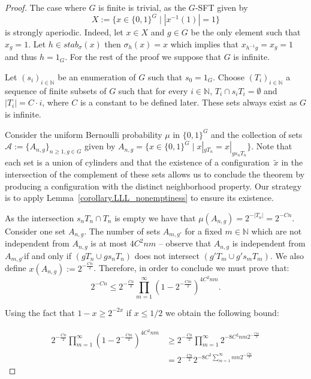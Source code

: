 \documentclass[letterpaper]{article}
\theoremstyle{plain}
\def\NN{\mathbb{N}}
\begin{document}
	\begin{proof}
	
		The case where $G$ is finite is trivial, as the $G$-SFT given by $$X := \{x \in \{0,1\}^G \mid |x^{-1}(1)| = 1 \}$$ is strongly aperiodic. Indeed, let $x \in X$ and $g \in G$ be the only element such that $x_g = 1$. Let $h \in stab_{\sigma}(x)$ then $\sigma_{h}(x) = x$ which implies that $x_{h^{-1}g}= x_g = 1$ and thus $h = 1_G$. For the rest of the proof we suppose that $G$ is infinite.
		
		Let $(s_i)_{i\in\NN}$ be an enumeration of $G$ such that $s_0=1_G$. Choose $(T_i)_{i\in\NN}$ a sequence of finite subsets of $G$ such that for every $i\in\NN$, $T_i\cap s_i T_i =\emptyset$ and $|T_i|=C\cdot i$, where $C$ is a constant to be defined later. These sets always exist as $G$ is infinite.
		
		Consider the uniform Bernoulli probability $\mu$ in $\{0,1\}^G$ and the collection of sets $\mathscr{A} := \{A_{n,g}\}_{n \geq 1, g \in G}$ given by $ A_{n,g} = \{ x \in \{0,1\}^G \mid x|_{gT_n} = x|_{gs_nT_n}\}$. Note that each set is a union of cylinders and that the existence of a configuration~$\tilde{x}$ in the intersection of the complement of these sets allows us to conclude the theorem by producing a configuration with the distinct neighborhood property. Our strategy is to apply Lemma~\ref{corollary.LLL_nonemptiness} to ensure its existence.
		
		As the intersection $s_nT_n \cap T_n$ is empty we have that $\mu(A_{n,g}) = 2^{-|T_n|} = 2^{-C n}$. Consider one set $A_{n,g}$. The number of sets $A_{m,g'}$ for a fixed $m \in \NN$ which are not independent from $A_{n,g}$ is at most $4C^2nm$ -- observe that $A_{n,g}$ is independent from $A_{m,g'}$if and only if $(gT_n\cup gs_nT_n)$ does not intersect $(g'T_m\cup g's_mT_m)$. We also define $x(A_{n,g}) := 2^{-\frac{Cn}{2}}$. Therefore, in order to conclude we must prove that: $$2^{-Cn} \leq 2^{-\frac{Cn}{2}} \prod_{m = 1}^{\infty}(1-2^{-\frac{Cm}{2}})^{4C^2nm}.$$
		
		Using the fact that $1-x \geq 2^{-2x}$ if $x \leq 1/2$ we obtain the following bound:
		
		\begin{align*}
		2^{-\frac{Cn}{2}} \prod_{m = 1}^{\infty}(1-2^{-\frac{Cm}{2}})^{4C^2nm}& \geq 2^{-\frac{Cn}{2}} \prod_{m = 1}^{\infty}2^{-8C^2nm2^{-\frac{Cm}{2}} } \\
		& = 2^{-\frac{Cn}{2}}2^{-8C^2 \sum_{m = 1}^{\infty}nm2^{-\frac{Cm}{2}} }
		\end{align*}
		

\end{proof}
\end{document}
